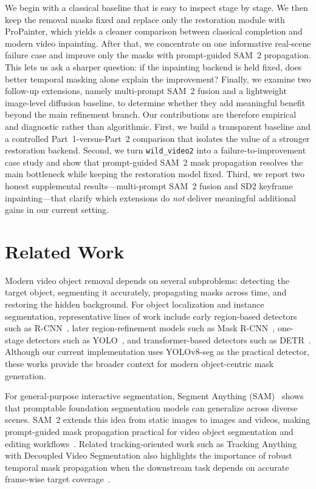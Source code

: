 \documentclass[10pt,twocolumn,letterpaper]{article}
\begin{document}
We begin with a classical baseline that is easy to inspect stage by stage.
We then keep the removal masks fixed and replace only the restoration module with ProPainter, which yields a cleaner comparison between classical completion and modern video inpainting.
After that, we concentrate on one informative real-scene failure case and improve only the masks with prompt-guided SAM~2 propagation.
This lets us ask a sharper question: if the inpainting backend is held fixed, does better temporal masking alone explain the improvement?
Finally, we examine two follow-up extensions, namely multi-prompt SAM~2 fusion and a lightweight image-level diffusion baseline, to determine whether they add meaningful benefit beyond the main refinement branch.
Our contributions are therefore empirical and diagnostic rather than algorithmic.
First, we build a transparent baseline and a controlled Part~1-versus-Part~2 comparison that isolates the value of a stronger restoration backend.
Second, we turn \texttt{wild\_video2} into a failure-to-improvement case study and show that prompt-guided SAM~2 mask propagation resolves the main bottleneck while keeping the restoration model fixed.
Third, we report two honest supplemental results---multi-prompt SAM~2 fusion and SD2 keyframe inpainting---that clarify which extensions do \emph{not} deliver meaningful additional gains in our current setting.

\section{Related Work}
Modern video object removal depends on several subproblems: detecting the target object, segmenting it accurately, propagating masks across time, and restoring the hidden background.
For object localization and instance segmentation, representative lines of work include early region-based detectors such as R-CNN~\cite{girshick2014rcnn}, later region-refinement models such as Mask R-CNN~\cite{he2017mask}, one-stage detectors such as YOLO~\cite{redmon2016yolo}, and transformer-based detectors such as DETR~\cite{carion2020detr}.
Although our current implementation uses YOLOv8-seg as the practical detector, these works provide the broader context for modern object-centric mask generation.

For general-purpose interactive segmentation, Segment Anything (SAM)~\cite{kirillov2023sam} shows that promptable foundation segmentation models can generalize across diverse scenes.
SAM~2 extends this idea from static images to images and videos, making prompt-guided mask propagation practical for video object segmentation and editing workflows~\cite{ravi2024sam2}.
Related tracking-oriented work such as Tracking Anything with Decoupled Video Segmentation also highlights the importance of robust temporal mask propagation when the downstream task depends on accurate frame-wise target coverage~\cite{cheng2023tracking}.
\end{document}
